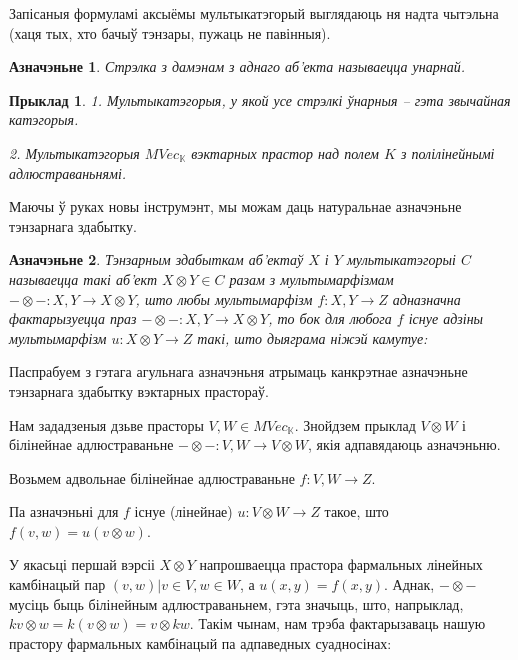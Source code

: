 \documentclass[a4paper,12pt]{book}
\newtheorem{example}{Прыклад}[section]
\newtheorem{definition}{Азначэньне}[section]
\begin{document}
Запісаныя формуламі аксыёмы мультыкатэгорый выглядаюць ня надта
чытэльна (хаця тых, хто бачыў тэнзары, пужаць не павінныя).

\begin{definition}
  Стрэлка з дамэнам з аднаго аб'екта называецца унарнай.
\end{definition}

\begin{example}
  1. Мультыкатэгорыя, у якой усе стрэлкі ўнарныя -- гэта звычайная
  катэгорыя.

  2. Мультыкатэгорыя $MVec_{\mathbb{K}}$ вэктарных прастор над полем
  $K$ з полілінейнымі адлюстраваньнямі.
\end{example}

Маючы ў руках новы інструмэнт, мы можам даць натуральнае азначэньне
тэнзарнага здабытку.

\begin{definition}
  Тэнзарным здабыткам аб'ектаў $X$ і $Y$ мультыкатэгорыі $C$
  называецца такі аб'ект $X \otimes Y \in C$ разам з мультымарфізмам
  $- \otimes -: X, Y \rightarrow X \otimes Y$, што любы мультымарфізм
  $f: X, Y \rightarrow Z$ адназначна фактарызуецца праз $- \otimes -:
  X, Y \rightarrow X \otimes Y$, то бок для любога $f$ існуе адзіны
  мультымарфізм $u: X \otimes Y \rightarrow Z$ такі, што дыяграма
  ніжэй камутуе:

\end{definition}

Паспрабуем з гэтага агульнага азначэньня атрымаць канкрэтнае
азначэньне тэнзарнага здабытку вэктарных прастораў.

Нам зададзеныя дзьве прасторы $V, W \in MVec_{\mathbb{K}}$.
Знойдзем прыклад $V \otimes W$ і білінейнае адлюстраваньне $-\otimes-: V, W
\rightarrow V \otimes W$, якія адпавядаюць азначэньню.

Возьмем адвольнае білінейнае адлюстраваньне $f: V, W \rightarrow
Z$.

Па азначэньні для $f$ існуе (лінейнае) $u: V \otimes W \rightarrow Z$ такое, што
$f(v, w) = u(v \otimes w)$.

У якасьці першай вэрсіі $X \otimes Y$ напрошваецца прастора фармальных
лінейных камбінацый пар $(v, w) | v \in V, w \in W$, а $u(x, y) = f(x,
y)$.
Аднак, $- \otimes -$ мусіць быць білінейным адлюстраваньнем, гэта
значыць, што, напрыклад, $kv \otimes w = k(v \otimes w) = v \otimes
kw$. Такім чынам, нам трэба фактарызаваць нашую прастору фармальных
камбінацый па адпаведных суадносінах:
\end{document}

